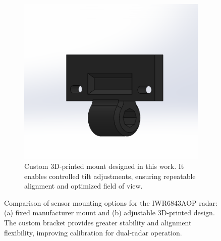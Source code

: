 \begin{figure}[!htbp]
\begin{subfigure}[t]{0.48\linewidth}
        \includegraphics[width=\linewidth]{images/3DModelSensorMount.png}
        \caption{Custom 3D-printed mount designed in this work. It enables controlled tilt adjustments, ensuring repeatable alignment and optimized field of view.}
        \label{fig:IWR6843AOP_3D_sensorMount}
    \end{subfigure}
    \caption{Comparison of sensor mounting options for the IWR6843AOP radar: (a) fixed manufacturer mount and (b) adjustable 3D-printed design. The custom bracket provides greater stability and alignment flexibility, improving calibration for dual-radar operation.}
    \label{fig:IWR6843AOP_mounts_comparison}
\end{figure}

